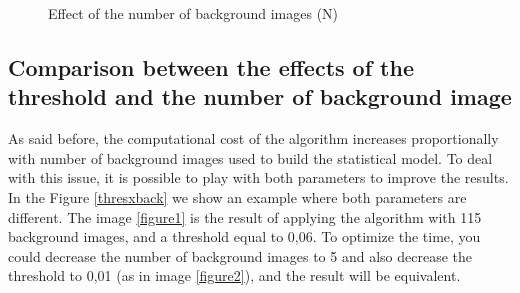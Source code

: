 \documentclass{article}
\begin{document}
\begin{figure}[H]
		  \hspace{0.1cm}
		  \caption{Effect of the number of background images (N)}
		  \label{fig:nback}
	\end{figure}
	

\subsection{Comparison between the effects of the threshold and the number of background image}
	As said before, the computational cost of the algorithm increases proportionally with number of background images used to build the statistical model. To deal with this issue, it is possible to play with both parameters to improve the results. In the Figure \ref{thresxback} we show an example where both parameters are different. The image \ref{figure1} is the result of applying the algorithm with 115 background images, and a threshold equal to 0,06. To optimize the time, you could decrease the number of background images to 5 and also decrease the threshold to 0,01 (as in image \ref{figure2}), and the result will be equivalent.
\end{document}

